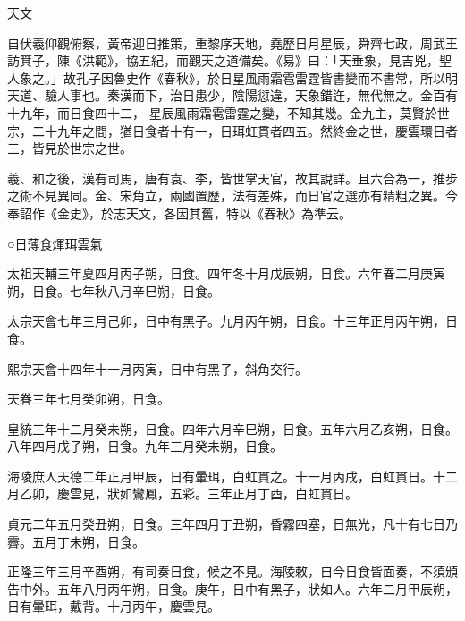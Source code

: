 
\begin{pinyinscope}

 天文



 自伏羲仰觀俯察，黃帝迎日推策，重黎序天地，堯歷日月星辰，舜齊七政，周武王訪箕子，陳《洪範》，協五紀，而觀天之道備矣。《易》曰：「天垂象，見吉兇，聖人象之。」故孔子因魯史作《春秋》，於日星風雨霜雹雷霆皆書變而不書常，所以明天道、驗人事也。秦漢而下，治日患少，陰陽愆違，天象錯迕，無代無之。金百有十九年，而日食四十二，
 星辰風雨霜雹雷霆之變，不知其幾。金九主，莫賢於世宗，二十九年之間，猶日食者十有一，日珥虹貫者四五。然終金之世，慶雲環日者三，皆見於世宗之世。



 羲、和之後，漢有司馬，唐有袁、李，皆世掌天官，故其說詳。且六合為一，推步之術不見異同。金、宋角立，兩國置歷，法有差殊，而日官之選亦有精粗之異。今奉詔作《金史》，於志天文，各因其舊，特以《春秋》為準云。



 ○日薄食煇珥雲氣



 太祖天輔三年夏四月丙子朔，日食。四年冬十月戊辰朔，日食。六年春二月庚寅朔，日食。七年秋八月辛巳朔，日食。



 太宗天會七年三月己卯，日中有黑子。九月丙午朔，日食。十三年正月丙午朔，日食。



 熙宗天會十四年十一月丙寅，日中有黑子，斜角交行。



 天眷三年七月癸卯朔，日食。



 皇統三年十二月癸未朔，日食。四年六月辛巳朔，日食。五年六月乙亥朔，日食。八年四月戊子朔，日食。九年三月癸未朔，日食。



 海陵庶人天德二年正月甲辰，日有暈珥，白虹貫之。十一月丙戌，白虹貫日。十二月乙卯，慶雲見，狀如鸞鳳，五彩。三年正月丁酉，白虹貫日。



 貞元二年五月癸丑朔，日食。三年四月丁丑朔，昏霧四塞，日無光，凡十有七日乃霽。五月丁未朔，日食。



 正隆三年三月辛酉朔，有司奏日食，候之不見。海陵敕，自今日食皆面奏，不須頒告中外。五年八月丙午朔，日食。庚午，日中有黑子，狀如人。六年二月甲辰朔，日有暈珥，戴背。十月丙午，慶雲見。




\end{pinyinscope}
